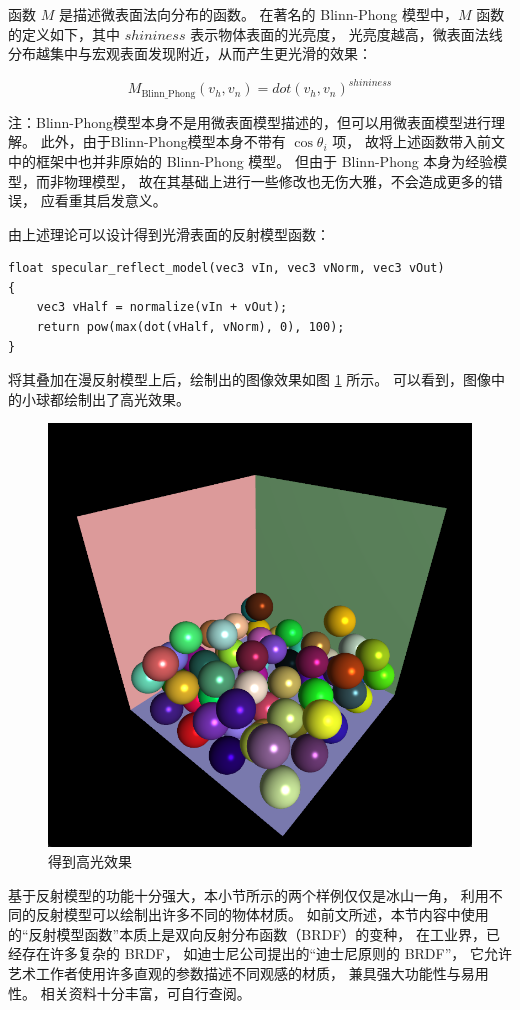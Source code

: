 \documentclass[fontset=windows]{ctexart}
\begin{document}
函数 $M$ 是描述微表面法向分布的函数。
在著名的 Blinn-Phong 模型中，$M$ 函数的定义如下，其中 $shininess$ 表示物体表面的光亮度，
光亮度越高，微表面法线分布越集中与宏观表面发现附近，从而产生更光滑的效果：

$$
M_{\text{Blinn\_Phong}}(v_h, v_n)=dot(v_h, v_n)^{shininess}
$$

注：Blinn-Phong模型本身不是用微表面模型描述的，但可以用微表面模型进行理解。
此外，由于Blinn-Phong模型本身不带有 $\cos\theta_i$ 项，
故将上述函数带入前文中的框架中也并非原始的 Blinn-Phong 模型。
但由于 Blinn-Phong 本身为经验模型，而非物理模型，
故在其基础上进行一些修改也无伤大雅，不会造成更多的错误，
应看重其启发意义。

由上述理论可以设计得到光滑表面的反射模型函数：

\begin{lstlisting}
float specular_reflect_model(vec3 vIn, vec3 vNorm, vec3 vOut)
{
    vec3 vHalf = normalize(vIn + vOut);
    return pow(max(dot(vHalf, vNorm), 0), 100);
}
\end{lstlisting}

将其叠加在漫反射模型上后，绘制出的图像效果如图 \ref{fig-gl:high-light} 所示。
可以看到，图像中的小球都绘制出了高光效果。

\begin{figure}[htbp]
\centering
\includegraphics[width=0.5\linewidth]{imgs/sec 7.1/high-light.png}
\caption{得到高光效果}
\label{fig-gl:high-light}
\end{figure}

基于反射模型的功能十分强大，本小节所示的两个样例仅仅是冰山一角，
利用不同的反射模型可以绘制出许多不同的物体材质。
如前文所述，本节内容中使用的“反射模型函数”本质上是双向反射分布函数（BRDF）的变种，
在工业界，已经存在许多复杂的 BRDF，
如迪士尼公司提出的“迪士尼原则的 BRDF”，
它允许艺术工作者使用许多直观的参数描述不同观感的材质，
兼具强大功能性与易用性。
相关资料十分丰富，可自行查阅。
\end{document}
